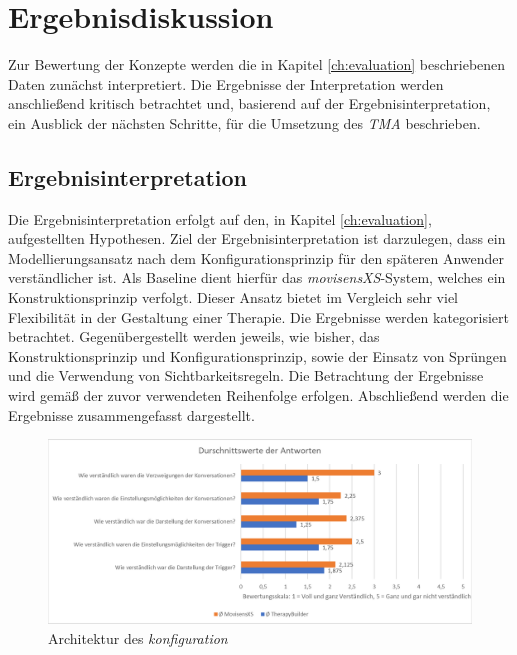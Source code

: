\chapter{Ergebnisdiskussion}
\label{ch:Results}
Zur Bewertung der Konzepte werden die in Kapitel \ref{ch:evaluation} beschriebenen Daten zunächst interpretiert. Die Ergebnisse der Interpretation werden anschließend kritisch betrachtet und, basierend auf der Ergebnisinterpretation, ein Ausblick der nächsten Schritte, für die Umsetzung des \emph{TMA} beschrieben. 


\section{Ergebnisinterpretation}
Die Ergebnisinterpretation erfolgt auf den, in Kapitel \ref{ch:evaluation}, aufgestellten Hypothesen. Ziel der Ergebnisinterpretation ist darzulegen, dass ein Modellierungsansatz nach dem Konfigurationsprinzip für den späteren Anwender verständlicher ist. Als Baseline dient hierfür das \emph{movisensXS}-System, welches ein Konstruktionsprinzip verfolgt. Dieser Ansatz bietet im Vergleich sehr viel Flexibilität in der Gestaltung einer Therapie. Die Ergebnisse werden kategorisiert betrachtet. Gegenübergestellt werden jeweils, wie bisher, das Konstruktionsprinzip und Konfigurationsprinzip, sowie der Einsatz von Sprüngen und die Verwendung von Sichtbarkeitsregeln. Die Betrachtung der Ergebnisse wird gemäß der zuvor verwendeten Reihenfolge erfolgen. Abschließend werden die Ergebnisse zusammengefasst dargestellt.

 
\begin{figure}[h]
\centering
\includegraphics[width=1\textwidth]{pictures/diagramme/antwortendurchsch1}
\caption{Architektur des \emph{konfiguration}}
\label{antwortendurchsch11}
\end{figure}

